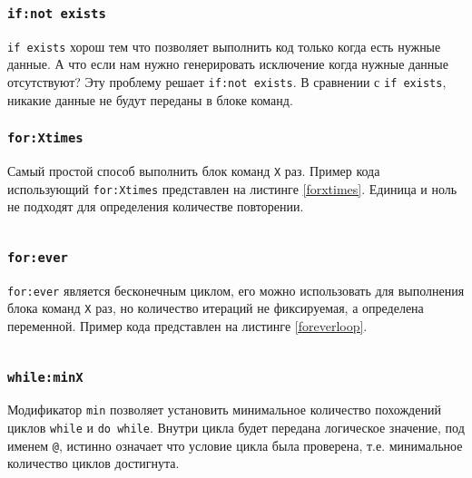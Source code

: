\subsubsection{\texttt{if:not exists}}

\texttt{if exists} хорош тем что позволяет выполнить код только когда есть нужные данные. А что если нам нужно генерировать исключение когда нужные данные отсутствуют? Эту проблему решает \texttt{if:not exists}. В сравнении с \texttt{if exists}, никакие данные не будут переданы в блоке команд.

\subsubsection{\texttt{for:Xtimes}}

Самый простой способ выполнить блок команд \texttt{X} раз. Пример кода использующий \texttt{for:Xtimes} представлен на листинге \ref{forxtimes}. Единица и ноль не подходят для определения количестве повторении.

\begin{sourcecode}
	\label{forxtimes}
    \inputminted[linenos]{icl}{../sources/forxtimes.icL}
\end{sourcecode}

\subsubsection{\texttt{for:ever}}

\texttt{for:ever} является бесконечным циклом, его можно использовать для выполнения блока команд \texttt{X} раз, но количество итераций не фиксируемая, а определена переменной. Пример кода представлен на листинге \ref{foreverloop}.

\begin{sourcecode}
	\label{foreverloop}
    \inputminted[linenos]{icl}{../sources/foreverloop.icL}
\end{sourcecode}

\subsubsection{\texttt{while:minX}}

Модификатор \texttt{min} позволяет установить минимальное количество похождений циклов \texttt{while} и \texttt{do while}. Внутри цикла будет передана логическое значение, под именем \texttt{@}, истинно означает что условие цикла была проверена, т.е. минимальное количество циклов достигнута.

